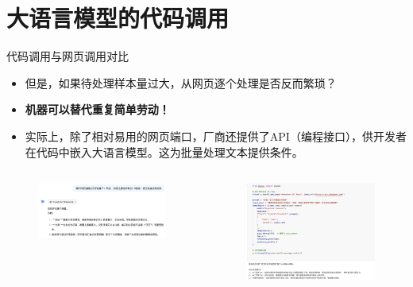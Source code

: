 \documentclass{beamer}
\begin{document}
\section{大语言模型的代码调用}
\begin{frame}{代码调用与网页调用对比}
    \begin{itemize}
        \item 但是，如果待处理样本量过大，从网页逐个处理是否反而繁琐？
        \item \textbf{机器可以替代重复简单劳动！}
        \pause 
        \item 实际上，除了相对易用的网页端口，厂商还提供了API（编程接口），供开发者在代码中嵌入大语言模型。这为批量处理文本提供条件。
      \end{itemize}
    \begin{columns}
	\begin{column}{.5\textwidth}
		\begin{figure}[htpb]
		\centering
		\includegraphics[width=1\linewidth]{figs/顶王.png}
	\end{figure}
	\end{column}
	
	\begin{column}{.5\textwidth}
		\begin{figure}[htpb]
			\centering
			\includegraphics[width=1\linewidth]{figs/顶王2.png}
		\end{figure}
	\end{column}
\end{columns}

  
\end{frame}
\end{document}
